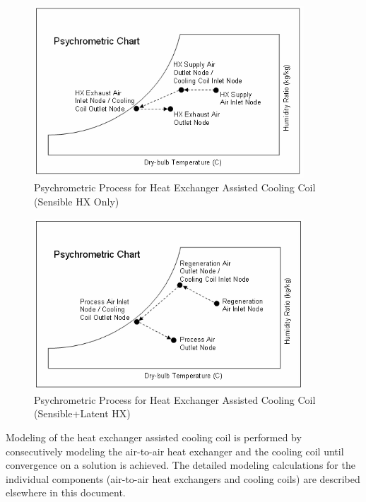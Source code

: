 \begin{figure}[hbtp] %
\centering
\includegraphics[width=0.9\textwidth, height=0.9\textheight, keepaspectratio=true]{media/image4092.png}
\caption{Psychrometric Process for Heat Exchanger Assisted Cooling Coil (Sensible HX Only) \protect \label{fig:psychrometric-process-for-heat-exchanger}}
\end{figure}

\begin{figure}[hbtp] %
\centering
\includegraphics[width=0.9\textwidth, height=0.9\textheight, keepaspectratio=true]{media/image4093.png}
\caption{Psychrometric Process for Heat Exchanger Assisted Cooling Coil (Sensible+Latent HX) \protect \label{fig:psychrometric-process-for-heat-exchanger-001}}
\end{figure}

Modeling of the heat exchanger assisted cooling coil is performed by consecutively modeling the air-to-air heat exchanger and the cooling coil until convergence on a solution is achieved. The detailed modeling calculations for the individual components (air-to-air heat exchangers and cooling coils) are described elsewhere in this document.

